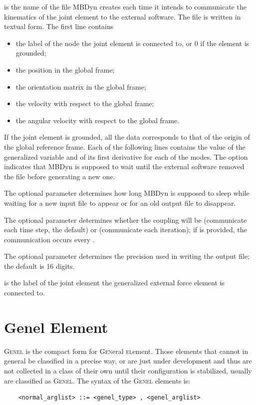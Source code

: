  is the name of the file MBDyn creates
each time it intends to communicate the kinematics of the 
joint element to the external software.
The file is written in textual form.
The first line contains
\begin{itemize}
\item the label of the  node the  joint element
	is connected to, or 0 if the element is grounded;
\item the position in the global frame;
\item the orientation matrix in the global frame;
\item the velocity with respect to the global frame;
\item the angular velocity with respect to the global frame.
\end{itemize}
If the  joint element is grounded, all the data corresponds
to that of the origin of the global reference frame.
Each of the following lines contains the value of the generalized variable
and of its first derivative for each of the modes.
The option  indicates that MBDyn is supposed to wait
until the external software removed the file before generating a new one.

The optional parameter  determines how long MBDyn
is supposed to sleep while waiting for a new input file to appear
or for an old output file to disappear.

The optional parameter  determines whether the coupling
will be  (communicate each time step, the default) or
 (communicate each iteration); if  is provided,
the communication occurs every .

The optional parameter  determines the precision
used in writing the output file; the default is 16 digits.

 is the label of the  joint element
the generalized external force element is connected to.



\section{Genel Element}
\textsc{Genel} is the compact form for \textsc{Gen}eral \textsc{el}ement.
Those elements that cannot in general be classified in a precise way, 
or are just under development and thus are not collected in a class 
of their own until their configuration is stabilized, usually are
classified as \textsc{Genel}.
The syntax of the \textsc{Genel} elements is:
\begin{verbatim}
    <normal_arglist> ::= <genel_type> , <genel_arglist>
\end{verbatim}

